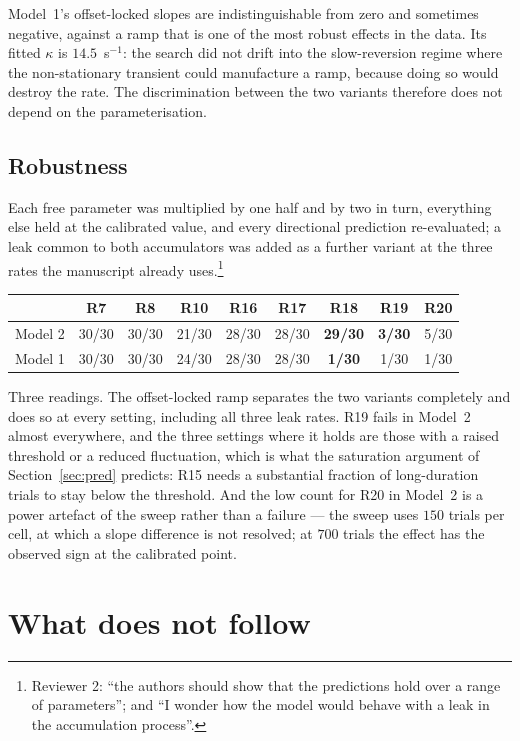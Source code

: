 \documentclass[a4paper,11pt]{article}
\newcommand{\RR}[1]{\textcolor{refcol}{#1}}
\newcommand{\refnote}[1]{\footnote{\textcolor{refcol}{\textsf{\footnotesize #1}}}}
\newcommand{\1}{\mathbbm{1}}
\begin{document}
Model~1's offset-locked slopes are indistinguishable from zero and sometimes negative,
against a ramp that is one of the most robust effects in the data. Its fitted
$\kappa$ is $14.5$~s$^{-1}$: the search did not drift into the slow-reversion
regime where the non-stationary transient could manufacture a ramp, because doing so
would destroy the rate. The discrimination
between the two variants therefore does not depend on the parameterisation.

\subsection{Robustness}

\RR{Each free parameter was multiplied by one half and by two in turn, everything else
held at the calibrated value, and every directional prediction re-evaluated; a leak
common to both accumulators was added as a further variant at the three rates the
manuscript already uses.}\refnote{Reviewer 2: ``the authors should show that the
predictions hold over a range of parameters''; and ``I wonder how the model would
behave with a leak in the accumulation process''.}

\begin{center}
\begin{tabular}{lcccccccc}
\toprule
& R7 & R8 & R10 & R16 & R17 & R18 & R19 & R20\\
\midrule
Model 2 & 30/30 & 30/30 & 21/30 & 28/30 & 28/30 & \textbf{29/30} & \textbf{3/30} & 5/30\\
Model 1 & 30/30 & 30/30 & 24/30 & 28/30 & 28/30 & \textbf{1/30} & 1/30 & 1/30\\
\bottomrule
\end{tabular}
\end{center}

Three readings. The offset-locked ramp separates the two variants completely and does so
at every setting, including all three leak rates. R19 fails in Model~2 almost
everywhere, and the three settings where it holds are those with a raised threshold or
a reduced fluctuation, which is what the saturation argument of Section~\ref{sec:pred} predicts: R15 needs a
substantial fraction of long-duration trials to stay below the threshold. And the low
count for R20 in Model~2 is a power artefact of the sweep rather than a failure --- the
sweep uses $150$ trials per cell, at which a slope difference is not resolved; at $700$
trials the effect has the observed sign at the calibrated point.

\section{What does not follow}
\label{sec:notfollow}
\end{document}
